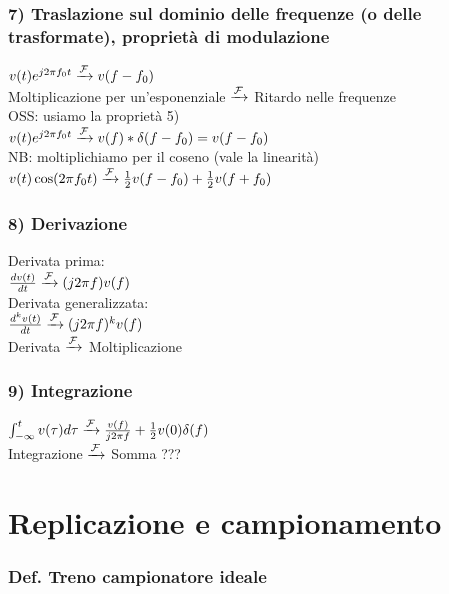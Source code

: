 	\subsubsection{7) Traslazione sul dominio delle frequenze (o delle trasformate), proprietà di modulazione}
	
	$ v(t) e^{ j 2 \pi f_0 t} \xrightarrow{ \mathcal{F}}  v(f-f_0)$\\
	Moltiplicazione per un'esponenziale $ \xrightarrow{ \mathcal{F}}$ Ritardo nelle frequenze\\
	OSS: usiamo la proprietà 5) \\
	$ v(t) e^{ j 2 \pi f_0 t} \xrightarrow{ \mathcal{F} } v(f) * \delta(f-f_0) = v(f-f_0)$\\
	NB: moltiplichiamo per il coseno (vale la linearità)\\
	$ v(t) \cos ( 2 \pi f_0 t) \xrightarrow{ \mathcal{F}}  \frac{1}{2}v(f-f_0) + \frac{1}{2}v(f+f_0)$\\
	
	
	\subsubsection{8) Derivazione}
	
	Derivata prima:\\
	$ \frac{d v(t)}{dt} \xrightarrow{ \mathcal{F}} (j2\pi f) v(f) $\\
	Derivata generalizzata:\\
	$ \frac{d^k v(t)}{dt} \xrightarrow{ \mathcal{F}} (j2\pi f)^k v(f) $\\
	Derivata $ \xrightarrow{ \mathcal{F}}$ Moltiplicazione
	
	\subsubsection{9) Integrazione}
	
	$ \int_{- \infty}^{ t} v( \tau) d\tau \xrightarrow{ \mathcal{F}} \frac{v(f)}{j2\pi f} + \frac{1}{2} v(0) \delta(f) $\\
	Integrazione $ \xrightarrow{ \mathcal{F}}$ Somma ???

\section{ Replicazione e campionamento }

	\subsubsection{Def. Treno campionatore ideale}
	
